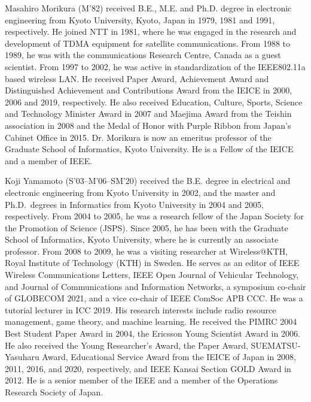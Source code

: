 \documentclass[journal]{IEEEtran}
\begin{document}
\begin{IEEEbiography}{Masahiro Morikura}
(M'82) received B.E., M.E. and Ph.D. degree in electronic engineering from Kyoto University, Kyoto, Japan in 1979, 1981 and 1991, respectively. He joined NTT in 1981, where he was engaged in the research and development of TDMA equipment for satellite communications.  From 1988 to 1989, he was with the communications Research Centre, Canada as a guest scientist. From 1997 to 2002, he was active in standardization of the IEEE802.11a based wireless LAN. He received Paper Award, Achievement Award and Distinguished Achievement and Contributions Award from the IEICE in 2000, 2006 and 2019, respectively. He also received Education, Culture, Sports, Science and Technology Minister Award in 2007 and Maejima Award from the Teishin association in 2008 and the Medal of Honor with Purple Ribbon from Japan’s Cabinet Office in 2015.
Dr. Morikura is now an emeritus professor of the Graduate School of Informatics, Kyoto University.  He is a Fellow of the IEICE and a member of IEEE.
\end{IEEEbiography}

\begin{IEEEbiography}{Koji Yamamoto}
(S'03--M'06--SM'20) received the B.E. degree in electrical and electronic engineering from Kyoto University in 2002, and the master and Ph.D.\ degrees in Informatics from Kyoto University in 2004 and 2005, respectively.
From 2004 to 2005, he was a research fellow of the Japan Society for the Promotion of Science (JSPS).
Since 2005, he has been with the Graduate School of Informatics, Kyoto University, where he is currently an associate professor.
From 2008 to 2009, he was a visiting researcher at Wireless@KTH, Royal Institute of Technology (KTH) in Sweden.
He serves as an editor of IEEE Wireless Communications Letters, IEEE Open Journal of Vehicular Technology, and Journal of Communications and Information Networks, a symposium co-chair of GLOBECOM 2021, and a vice co-chair of IEEE ComSoc APB CCC.
He was a tutorial lecturer in ICC 2019.
His research interests include radio resource management, game theory, and machine learning.
He received the PIMRC 2004 Best Student Paper Award in 2004, the Ericsson Young Scientist Award in 2006.
He also received the Young Researcher's Award, the Paper Award, SUEMATSU-Yasuharu Award, Educational Service Award from the IEICE of Japan in 2008, 2011, 2016, and 2020, respectively, and IEEE Kansai Section GOLD Award in 2012.
He is a senior member of the IEEE and a member of the Operations Research Society of Japan.
\end{IEEEbiography}
\end{document}

